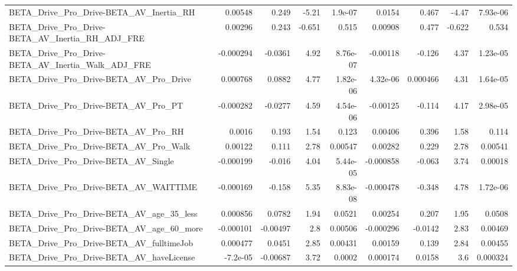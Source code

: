 \begin{tabular}{lrrrrrrrr}
BETA\_Drive\_Pro\_Drive-BETA\_AV\_Inertia\_RH            &     0.00548 &        0.249 &    -5.21 &  1.9e-07 &     0.0154 &       0.467 &        -4.47 &      7.93e-06 \\
BETA\_Drive\_Pro\_Drive-BETA\_AV\_Inertia\_RH\_ADJ\_FRE    &     0.00296 &        0.243 &   -0.651 &    0.515 &    0.00908 &       0.477 &       -0.622 &         0.534 \\
BETA\_Drive\_Pro\_Drive-BETA\_AV\_Inertia\_Walk\_ADJ\_FRE  &   -0.000294 &      -0.0361 &     4.92 & 8.76e-07 &   -0.00118 &      -0.126 &         4.37 &      1.23e-05 \\
BETA\_Drive\_Pro\_Drive-BETA\_AV\_Pro\_Drive             &    0.000768 &       0.0882 &     4.77 & 1.82e-06 &   4.32e-06 &    0.000466 &         4.31 &      1.64e-05 \\
BETA\_Drive\_Pro\_Drive-BETA\_AV\_Pro\_PT                &   -0.000282 &      -0.0277 &     4.59 & 4.54e-06 &   -0.00125 &      -0.114 &         4.17 &      2.98e-05 \\
BETA\_Drive\_Pro\_Drive-BETA\_AV\_Pro\_RH                &      0.0016 &        0.193 &     1.54 &    0.123 &    0.00406 &       0.396 &         1.58 &         0.114 \\
BETA\_Drive\_Pro\_Drive-BETA\_AV\_Pro\_Walk              &     0.00122 &        0.111 &     2.78 &  0.00547 &    0.00282 &       0.229 &         2.78 &       0.00541 \\
BETA\_Drive\_Pro\_Drive-BETA\_AV\_Single                &   -0.000199 &       -0.016 &     4.04 & 5.44e-05 &  -0.000858 &      -0.063 &         3.74 &       0.00018 \\
BETA\_Drive\_Pro\_Drive-BETA\_AV\_WAITTIME              &   -0.000169 &       -0.158 &     5.35 & 8.83e-08 &  -0.000478 &      -0.348 &         4.78 &      1.72e-06 \\
BETA\_Drive\_Pro\_Drive-BETA\_AV\_age\_35\_less           &    0.000856 &       0.0782 &     1.94 &   0.0521 &    0.00254 &       0.207 &         1.95 &        0.0508 \\
BETA\_Drive\_Pro\_Drive-BETA\_AV\_age\_60\_more           &   -0.000101 &     -0.00497 &      2.8 &  0.00506 &  -0.000296 &     -0.0142 &         2.83 &       0.00469 \\
BETA\_Drive\_Pro\_Drive-BETA\_AV\_fulltimeJob           &    0.000477 &       0.0451 &     2.85 &  0.00431 &    0.00159 &       0.139 &         2.84 &       0.00455 \\
BETA\_Drive\_Pro\_Drive-BETA\_AV\_haveLicense           &    -7.2e-05 &     -0.00687 &     3.72 &   0.0002 &   0.000174 &      0.0158 &          3.6 &      0.000324 \\

\end{tabular}
